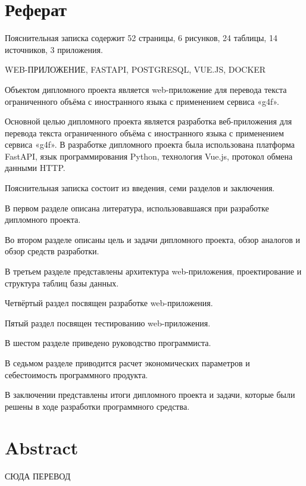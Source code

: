 \clearpage
\section*{Реферат}
Пояснительная записка содержит 52 страницы, 6 рисунков, 24 таблицы,
14 источников, 3 приложения. 

WEB-ПРИЛОЖЕНИЕ, FASTAPI, POSTGRESQL, VUE.JS, DOCKER

Объектом дипломного проекта является web-приложение для перевода текста ограниченного объёма с иностранного языка с применением сервиса «g4f».

Основной целью дипломного проекта является разработка веб-приложения для перевода текста ограниченного объёма с иностранного языка с применением сервиса «g4f». В разработке дипломного проекта была использована платформа FastAPI, язык программирования Python, технология Vue.js, протокол обмена данными HTTP.

Пояснительная записка состоит из введения, семи разделов и заключения.

В первом разделе описана литература, использовавшаяся при разработке дипломного проекта.

Во втором разделе описаны цель и задачи дипломного проекта, обзор аналогов и обзор средств разработки.

В третьем разделе представлены архитектура web-приложения, проектирование и структура таблиц базы данных.

Четвёртый раздел посвящен разработке web-приложения.

Пятый раздел посвящен тестированию web-приложения.

В шестом разделе приведено руководство программиста.

В седьмом разделе приводится расчет экономических параметров и себестоимость программного продукта.

В заключении представлены итоги дипломного проекта и задачи, которые были решены в ходе разработки программного средства.

\clearpage
\section*{Abstract}
СЮДА ПЕРЕВОД
